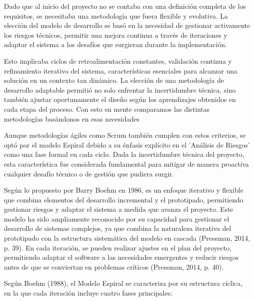 
Dado que al inicio del proyecto no se contaba con una definición completa de los requisitos, se necesitaba una metodología que fuera flexible y evolutiva. La elección del modelo de desarrollo se basó en la necesidad de gestionar activamente los riesgos técnicos, permitir una mejora continua a través de iteraciones y adaptar el sistema a los desafíos que surgieran durante la implementación.

Esto implicaba ciclos de retroalimentación constantes, validación continua y refinamiento iterativo del sistema, características esenciales para alcanzar una solución en un contexto tan dinámico. La elección de una metodología de desarrollo adaptable permitió no solo enfrentar la incertidumbre técnica, sino también ajustar oportunamente el diseño según los aprendizajes obtenidos en cada etapa del proceso. Con esto en mente comparamos las distintas metodologías basándonos en esas necesidades


Aunque metodologías ágiles como Scrum también cumplen con estos criterios, se optó por el modelo Espiral debido a su énfasis explícito en el 'Análisis de Riesgos' como una fase formal en cada ciclo. Dada la incertidumbre técnica del proyecto, esta característica fue considerada fundamental para mitigar de manera proactiva cualquier desafío técnico o de gestión que pudiera surgir.

Según lo propuesto por Barry Boehm en 1986, es un enfoque iterativo y flexible que combina elementos del desarrollo incremental y el prototipado, permitiendo gestionar riesgos y adaptar el sistema a medida que avanza el proyecto. Este modelo ha sido ampliamente reconocido por su capacidad para gestionar el desarrollo de sistemas complejos, ya que combina la naturaleza iterativa del prototipado con la estructura sistemática del modelo en cascada (Pressman, 2014, p. 39). En cada iteración, se pueden realizar ajustes en el plan del proyecto, permitiendo adaptar el software a las necesidades emergentes y reducir riesgos antes de que se conviertan en problemas críticos (Pressman, 2014, p. 40).

Según Boehm (1988), el Modelo Espiral se caracteriza por su estructura cíclica, en la que cada iteración incluye cuatro fases principales:

